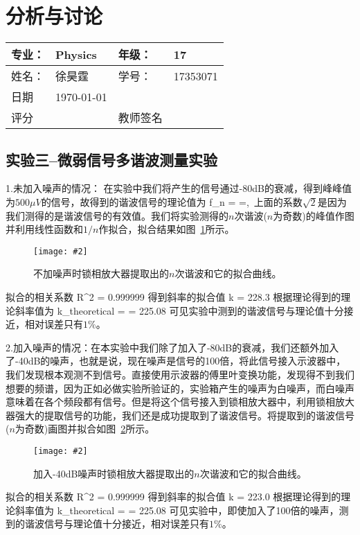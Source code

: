\documentclass[11pt,a4paper]{ctexart}
\newcommand{\cpic}[2]{
\begin{center}
\texttt{[image: \#2]}
\end{center}
}
\newcommand{\cpicn}[3]
{
\begin{figure}[H]
\cpic{#1}{#2}
\caption{\color{red}#3\label{#2}}
\end{figure}
}
\begin{document}
\section{分析与讨论}
\begin{tabular}{|p{7em}|p{7em}|p{7em}|p{7em}|}
	\hline 
	专业：     &Physics       &年级：      & 17     \\
	\hline
	姓名：& 徐昊霆 &学号：&17353071  \\
	\hline
	日期&  \today              & &  \\
	\hline	
	评分 & & 教师签名 & \\
	\hline
\end{tabular}

\subsection{实验三--微弱信号多谐波测量实验}
1.未加入噪声的情况：
在实验中我们将产生的信号通过-80dB的衰减，得到峰峰值为$500\mu V$的信号，故得到的谐波信号的理论值为
\be
f_n = =,\, 
\ee
上面的系数$\sqrt{2}$是因为我们测得的是谐波信号的有效值。我们将实验测得的$n$次谐波($n$为奇数)的峰值作图并利用线性函数和$1/n$作拟合，拟合结果如图~\ref{without_noise.jpg}所示。
\cpicn{0.5}{without_noise.jpg}{不加噪声时锁相放大器提取出的$n$次谐波和它的拟合曲线。}
拟合的相关系数
\be
R^2 = 0.999999
\ee
得到斜率的拟合值
\be
k = 228.3  
\ee
根据理论得到的理论斜率值为
\be
k_{\rm theoretical} =  = 225.08  
\ee
可见实验中测到的谐波信号与理论值十分接近，相对误差只有$1\%$。

2.加入噪声的情况：在本实验中我们除了加入了-80dB的衰减，我们还额外加入了-40dB的噪声，也就是说，现在噪声是信号的100倍，将此信号接入示波器中，我们发现根本观测不到信号。直接使用示波器的傅里叶变换功能，发现得不到我们想要的频谱，因为正如必做实验所验证的，实验箱产生的噪声为白噪声，而白噪声意味着在各个频段都有信号。但是将这个信号接入到锁相放大器中，利用锁相放大器强大的提取信号的功能，我们还是成功提取到了谐波信号。将提取到的谐波信号($n$为奇数)画图并拟合如图~\ref{with_noise.jpg}所示。
\cpicn{0.5}{with_noise.jpg}{加入-40dB噪声时锁相放大器提取出的$n$次谐波和它的拟合曲线。}

拟合的相关系数
\be
R^2 = 0.999999
\ee
得到斜率的拟合值
\be
k = 223.0  
\ee
根据理论得到的理论斜率值为
\be
k_{\rm theoretical} =  = 225.08  
\ee
可见实验中，即使加入了100倍的噪声，测到的谐波信号与理论值十分接近，相对误差只有$1\%$。
\end{document}
